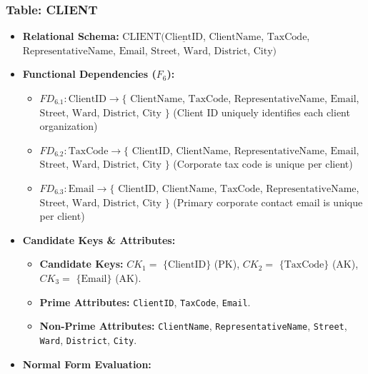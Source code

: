 \documentclass[a4paper,12pt]{report}
\begin{document}
\subsubsection{Table: CLIENT}\label{table-client}

\begin{itemize}
\item
  \textbf{Relational Schema:} \(\text{CLIENT}(\underline{\text{ClientID}}\), \(\text{ClientName}\), \(\text{TaxCode}\), \(\text{RepresentativeName}\), \(\text{Email}\), \(\text{Street}\), \(\text{Ward}\), \(\text{District}\), \(\text{City})\)
\item
  \textbf{Functional Dependencies (\(F_{6}\)):}

  \begin{itemize}
  \item
    \(FD_{6.1}: \text{ClientID} \rightarrow \{\) \(\text{ClientName}\), \(\text{TaxCode}\), \(\text{RepresentativeName}\), \(\text{Email}\), \(\text{Street}\), \(\text{Ward}\), \(\text{District}\), \(\text{City}\) \(\}\) (Client ID uniquely identifies each client organization)
  \item
    \(FD_{6.2}: \text{TaxCode} \rightarrow \{\) \(\text{ClientID}\), \(\text{ClientName}\), \(\text{RepresentativeName}\), \(\text{Email}\), \(\text{Street}\), \(\text{Ward}\), \(\text{District}\), \(\text{City}\) \(\}\) (Corporate tax code is unique per client)
  \item
    \(FD_{6.3}: \text{Email} \rightarrow \{\) \(\text{ClientID}\), \(\text{ClientName}\), \(\text{TaxCode}\), \(\text{RepresentativeName}\), \(\text{Street}\), \(\text{Ward}\), \(\text{District}\), \(\text{City}\) \(\}\) (Primary corporate contact email is unique per client)
  \end{itemize}
\item
  \textbf{Candidate Keys \& Attributes:}

  \begin{itemize}
  \item
    \textbf{Candidate Keys:} \(CK_{1} =\) \(\{\text{ClientID}\}\) (PK), \(CK_{2} =\) \(\{\text{TaxCode}\}\) (AK), \(CK_{3} =\) \(\{\text{Email}\}\) (AK).
  \item
    \textbf{Prime Attributes:} \texttt{ClientID}, \texttt{TaxCode}, \texttt{Email}.
  \item
    \textbf{Non-Prime Attributes:} \texttt{ClientName}, \texttt{RepresentativeName}, \texttt{Street}, \texttt{Ward}, \texttt{District}, \texttt{City}.
  \end{itemize}
\item
  \textbf{Normal Form Evaluation:}


\end{itemize}
\end{document}
